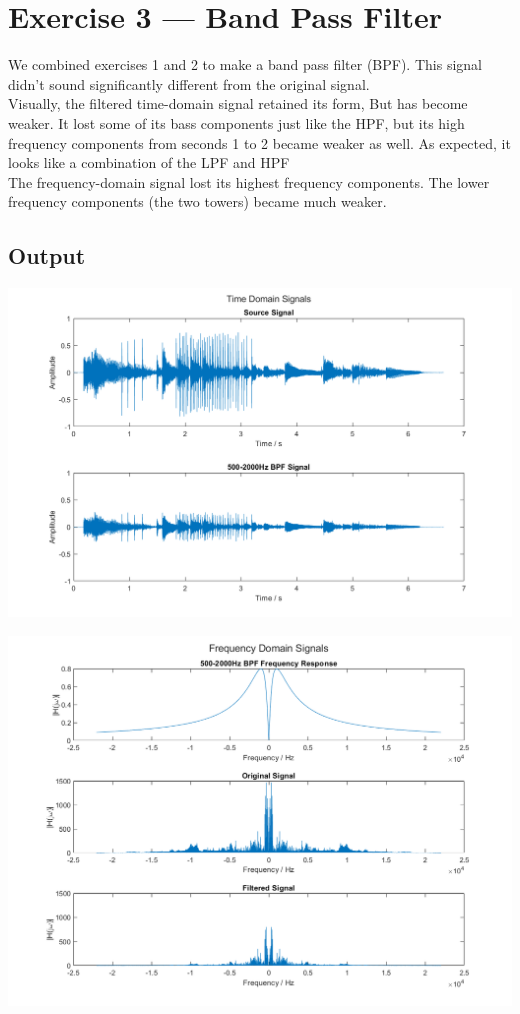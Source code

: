 \documentclass[11pt]{article}
\begin{document}


\section{Exercise 3 --- Band Pass Filter}

We combined exercises 1 and 2 to make a band pass filter (BPF).
This signal didn't sound significantly different from the original
signal.\\

Visually, the filtered time-domain signal retained its form, But has
become weaker. It lost some of its bass components just
like the HPF, but its high frequency components from seconds 1 to 2
became weaker as well. As expected, it looks like a combination of the LPF and HPF\\

The frequency-domain signal lost its highest frequency components.
The lower frequency components (the two towers) became much weaker.

\subsection{Output}

\includegraphics[width=\textwidth]{bpf_time.png}

\includegraphics[width=\textwidth]{bpf_frequency.png}
\end{document}
